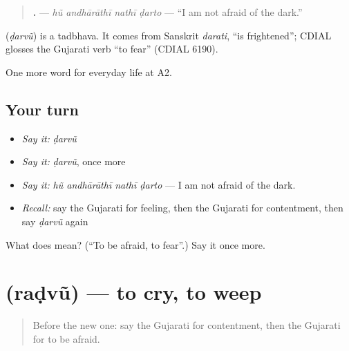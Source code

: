 \begin{quote}
\textbf{   .} — \emph{hũ andhārāthī nathī ḍarto} — \textquotedblleft{}I am not afraid of the dark.\textquotedblright{}
\end{quote}

\begin{cousinweb}
\textbf{} (\emph{ḍarvũ}) is a tadbhava. It comes from Sanskrit \emph{darati}, \textquotedblleft{}is frightened\textquotedblright{}; CDIAL glosses the Gujarati verb \textquotedblleft{}to fear\textquotedblright{} (CDIAL 6190).
\end{cousinweb}

\begin{grammarlens}[title={What you've built}]
One more word for everyday life at A2.
\end{grammarlens}

\subsection*{Your turn}
\begin{itemize}
\raggedright
  \item \emph{Say it:} \emph{ḍarvũ}
  \item \emph{Say it:} \emph{ḍarvũ}, once more
  \item \emph{Say it:} \emph{hũ andhārāthī nathī ḍarto} — I am not afraid of the dark.
  \item \emph{Recall:} say the Gujarati for feeling, then the Gujarati for contentment, then say \emph{ḍarvũ} again
\end{itemize}

\begin{tcolorbox}[breakable,colback=teal!4,colframe=teal!35!black,title={Before you move on}]
What does  mean? (\textquotedblleft{}To be afraid, to fear\textquotedblright{}.) Say it once more.
\end{tcolorbox}
\section[\texorpdfstring{\gu{રડવું} (raḍvũ)}{રડવું (raḍvũ)}]{ (raḍvũ) — to cry, to weep}

\label{lesson:GU-C266-radvu}



\begin{quote}
Before the new one: say the Gujarati for contentment, then the Gujarati for to be afraid.
\end{quote}


